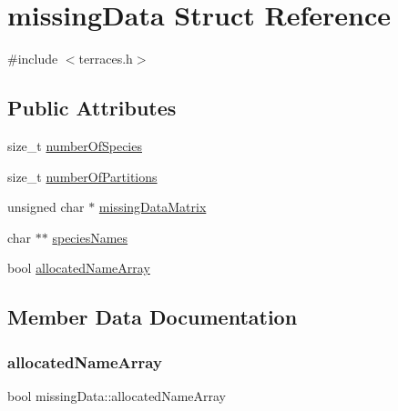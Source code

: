 \hypertarget{structmissingData}{}\section{missing\+Data Struct Reference}
\label{structmissingData}


{\ttfamily \#include $<$terraces.\+h$>$}

\subsection*{Public Attributes}
\begin{DoxyCompactItemize}
\item 
size\+\_\+t \hyperlink{structmissingData_a00557e059d863ca52d69e5e7c6902bb5}{number\+Of\+Species}
\item 
size\+\_\+t \hyperlink{structmissingData_ad72067004d4880edb70f5c1e34f9f89a}{number\+Of\+Partitions}
\item 
unsigned char $\ast$ \hyperlink{structmissingData_a1eca07c43d1fedb1db96890dd8c4c804}{missing\+Data\+Matrix}
\item 
char $\ast$$\ast$ \hyperlink{structmissingData_af6894ef72fad6a289101c37230b9a5f6}{species\+Names}
\item 
bool \hyperlink{structmissingData_a50d97283cf83e155a2517e1951c753d1}{allocated\+Name\+Array}
\end{DoxyCompactItemize}


\subsection{Member Data Documentation}
\mbox{\label{structmissingData_a50d97283cf83e155a2517e1951c753d1}} 
\subsubsection{\texorpdfstring{allocated\+Name\+Array}{allocatedNameArray}}
{\footnotesize\ttfamily bool missing\+Data\+::allocated\+Name\+Array}

\mbox{\label{structmissingData_a1eca07c43d1fedb1db96890dd8c4c804}} 
